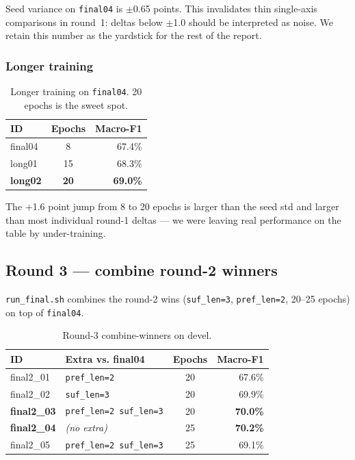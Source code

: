 \documentclass[a4paper,12pt]{article}
\begin{document}
Seed variance on \texttt{final04} is $\pm$0.65 points. This invalidates
thin single-axis comparisons in round~1: deltas below $\pm$1.0 should
be interpreted as noise. We retain this number as the yardstick for
the rest of the report.

\subsubsection{Longer training}

\begin{table}[H]
\centering
\small
\begin{tabular}{l c r}
\hline
\textbf{ID} & \textbf{Epochs} & \textbf{Macro-F1} \\
\hline
final04  &  8 & 67.4\% \\
long01   & 15 & 68.3\% \\
\rowcolor{green!10} \textbf{long02} & \textbf{20} & \textbf{69.0\%} \\
\hline
\end{tabular}
\caption{Longer training on \texttt{final04}. 20 epochs is the sweet
spot.}
\label{tab:12-longer}
\end{table}

The +1.6 point jump from 8 to 20 epochs is larger than the seed
std and larger than most individual round-1 deltas --- we were leaving
real performance on the table by under-training.

\subsection{Round 3 --- combine round-2 winners}
\label{sec:12-round3}

\texttt{run\_final.sh} combines the round-2 wins (\texttt{suf\_len=3},
\texttt{pref\_len=2}, 20--25 epochs) on top of \texttt{final04}.

\begin{table}[H]
\centering
\small
\begin{tabular}{l l c r}
\hline
\textbf{ID} & \textbf{Extra vs. final04} & \textbf{Epochs} & \textbf{Macro-F1} \\
\hline
final2\_01 & \texttt{pref\_len=2}              & 20 & 67.6\% \\
final2\_02 & \texttt{suf\_len=3}               & 20 & 69.9\% \\
\rowcolor{green!10}\textbf{final2\_03} & \texttt{pref\_len=2 suf\_len=3} & 20 & \textbf{70.0\%} \\
\rowcolor{green!10}\textbf{final2\_04} & \textit{(no extra)}             & 25 & \textbf{70.2\%} \\
final2\_05 & \texttt{pref\_len=2 suf\_len=3}   & 25 & 69.1\% \\
\hline
\end{tabular}
\caption{Round-3 combine-winners on devel.}
\label{tab:12-round3}
\end{table}
\end{document}
